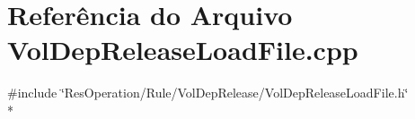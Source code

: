\section{Referência do Arquivo Vol\+Dep\+Release\+Load\+File.\+cpp}
\label{_rule_2_vol_dep_release_2_vol_dep_release_load_file_8cpp}
{\ttfamily \#include \char`\"{}Res\+Operation/\+Rule/\+Vol\+Dep\+Release/\+Vol\+Dep\+Release\+Load\+File.\+h\char`\"{}}\\*
